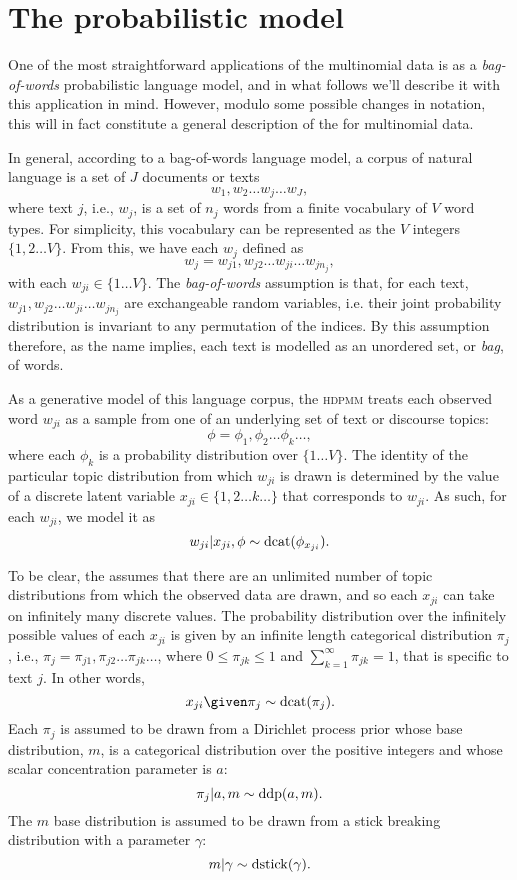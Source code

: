 \section{The probabilistic model}

One of the most straightforward applications of the multinomial data \hdpmm is
as a \emph{bag-of-words} probabilistic language model, and in what follows
we'll describe it with this application in mind. However, modulo some possible
changes in notation, this will in fact constitute a general description of the
\hdpmm for multinomial data.

In general, according to a bag-of-words language model, a corpus of natural
language is a set of $J$ documents or texts \[w_1, w_2 \ldots w_j \ldots w_J,\]
where text $j$, i.e., $w_j$, is a set of $n_j$ words from a finite vocabulary
of $V$ word types. For simplicity, this vocabulary can be represented as the
$V$ integers $\{1, 2 \ldots V\}$.  From this, we have each $w_j$ defined as
\[w_j = w_{j1}, w_{j2} \ldots w_{ji} \ldots w_{jn_j},\] with each $w_{ji} \in
\{1 \ldots V\}$.  The \emph{bag-of-words} assumption is that, for each text,
$w_{j1}, w_{j2} \ldots w_{ji} \ldots w_{jn_j}$ are exchangeable random
variables, i.e.  their joint probability distribution is invariant to any
permutation of the indices.  By this assumption therefore, as the name implies,
each text is modelled as an unordered set, or \emph{bag}, of words.

As a generative model of this language corpus, the \textsc{hdpmm} treats each
observed word $w_{ji}$ as a sample from one of an underlying set of text or
discourse topics: \[ \phi = \phi_1, \phi_2 \ldots \phi_k \ldots, \] where each
$\phi_k$ is a probability distribution over $\{1 \ldots V\}$.  The identity of
the particular topic distribution from which $w_{ji}$ is drawn is determined by
the value of a discrete latent variable $x_{ji} \in \{1, 2 \ldots k \ldots\}$
that corresponds to $w_{ji}$. As such, for each $w_{ji}$, we model it as
\[w_{ji}\vert x_{ji}, \phi \sim \mathrm{dcat}(\phi_{x_{ji}}).\] 

To be clear, the \hdpmm assumes that there are an unlimited number of topic
distributions from which the observed data are drawn, and so each $x_{ji}$ can
take on infinitely many discrete values.  The probability distribution over the
infinitely possible values of each $x_{ji}$ is given by an infinite length
categorical distribution $\pi_j$, i.e., $\pi_j = \pi_{j1}, \pi_{j2} \ldots
\pi_{jk} \ldots$, where $0 \leq \pi_{jk} \leq 1$ and $\sum_{k=1}^\infty
\pi_{jk} = 1$, that is specific to text $j$.  In other words, \[x_{ji} \given
\pi_j \sim \dcat{\pi_j}.\] Each $\pi_j$ is assumed to be drawn from a Dirichlet
process prior whose base distribution, $m$, is a categorical distribution over
the positive integers and whose scalar concentration parameter is $a$: 
\[\pi_j\vert a,m \sim \mathrm{ddp}(a,m).\]
The $m$ base distribution is assumed to be drawn from a stick breaking
distribution with a parameter $\gamma$: \[ m\vert\gamma \sim \mathrm{dstick}(\gamma).
\]

